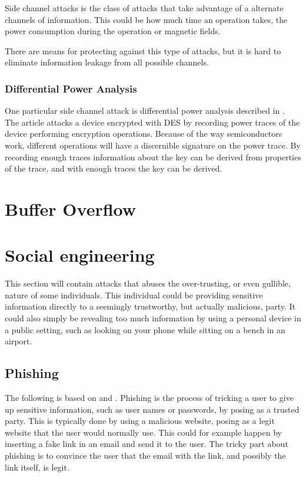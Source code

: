 Side channel attacks is the class of attacks that take advantage of a alternate channels of information.
This could be how much time an operation takes, the power consumption during the operation or magnetic fields.

There are means for protecting against this type of attacks, but it is hard to eliminate information leakage from all possible channels.

\subsubsection{Differential Power Analysis}
One particular side channel attack is differential power analysis described in \citet{DPA}.
The article attacks a device encrypted with DES by recording power traces of the device performing encryption operations.
Because of the way semiconductors work, different operations will have a discernible signature on the power trace.
By recording enough traces information about the key can be derived from properties of the trace, and with enough traces the key can be derived.


\section{Buffer Overflow}


\section{Social engineering}
This section will contain attacks that abuses the over-trusting, or even gullible, nature of some individuals.
This individual could be providing sensitive information directly to a seemingly trustworthy, but actually malicious, party.
It could also simply be revealing too much information by using a personal device in a public setting, such as looking on your phone while sitting on a bench in an airport.

\subsection{Phishing}

The following is based on \citet{security_engineering_ross_anderson} and \citet{dhamija2006phishing}.
Phishing is the process of tricking a user to give up sensitive information, such as user names or passwords, by posing as a trusted party.
This is typically done by using a malicious website, posing as a legit website that the user would normally use.
This could for example happen by inserting a fake link in an email and send it to the user.
The tricky part about phishing is to convince the user that the email with the link, and possibly the link itself, is legit.

